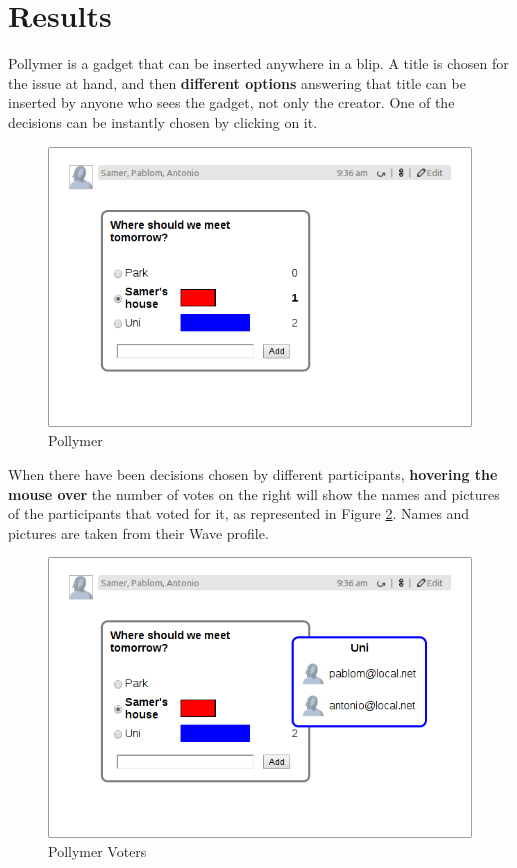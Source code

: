 \section{Results}
Pollymer is a gadget that can be inserted anywhere in a blip. A title is chosen for the issue at hand, and then \textbf{different options} answering that title can be inserted by anyone who sees the gadget, not only the creator. One of the decisions can be instantly chosen by clicking on it.
\begin{figure}[h]
  \center
    \includegraphics[keepaspectratio, scale=0.35]{Media/Captures/Extensions/DecisionMakerGadget.png}
  \caption{Pollymer}
  \label{fig:decision_maker_gadget}
\end{figure}
When there have been decisions chosen by different participants, \textbf{hovering the mouse over} the number of votes on the right will show the names and pictures of the participants that voted for it, as represented in Figure \ref{fig:decision_maker_votes}. Names and pictures are taken from their Wave profile.
\begin{figure}[h]
  \center
    \includegraphics[keepaspectratio, scale=0.35]{Media/Captures/Extensions/DecisionMakerGadget_votes.png}
  \caption{Pollymer Voters}
  \label{fig:decision_maker_votes}
\end{figure}
